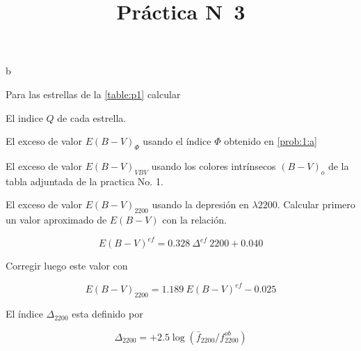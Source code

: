 \documentclass[12pt,a4paper]{practice}
\begin{document}
    \title{Práctica N\textdegree\ 3}b
    \maketitle


    \begin{problem}\label{prob:1}
        Para las estrellas de la \ref{table:p1} calcular

        \begin{ppart}\label{prob:1:a}
            El indice $Q$ de cada estrella.
        \end{ppart}

        \begin{ppart}\label{prob:1:b}
            El exceso de valor $E(B-V)_{\Phi}$ usando el índice $\Phi$ obtenido en \ref{prob:1:a}
        \end{ppart}

        \begin{ppart}\label{prob:1:c}
            El exceso de valor $E(B-V)_{VBV}$ usando los colores intrínsecos $(B-V)_{o}$ de la tabla adjuntada de la practica No. 1.
        \end{ppart}

        \begin{ppart}\label{prob:1:d}
            El exceso de valor $E(B-V)_{2200}$ usando la depresión en $\lambda 2200$. Calcular primero un valor aproximado de $E(B-V)$ con la relación.

            $$
                E(B-V)^{ef} = 0.328\  \Delta ^{ef}\ 2200 + 0.040
            $$

            Corregir luego este valor con

            $$
                E(B-V)_{2200} = 1.189\  E(B-V)^{ef}- 0.025
            $$

            El índice $\Delta_{2200}$ esta definido por

            $$
                \Delta_{2200} = +2.5 \log \left(\bar{f}_{2200}/f_{2200}^{ob}\right)
            $$
        \end{ppart}


\end{problem}
\end{document}
